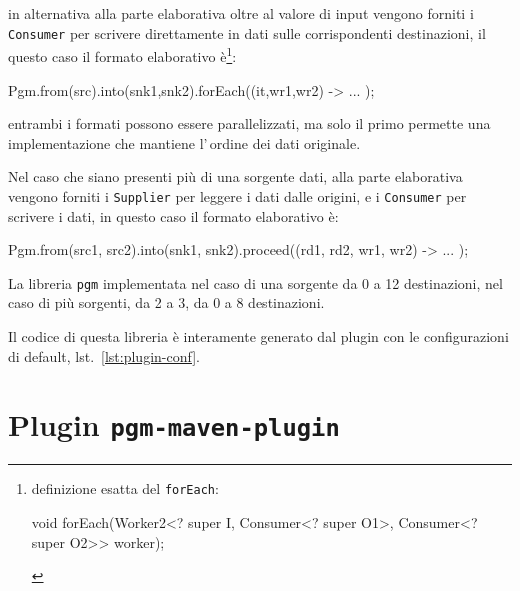 in alternativa alla parte elaborativa oltre al valore di input vengono forniti i
\texttt{Consumer} per scrivere direttamente in dati sulle corrispondenti
destinazioni, il questo caso il formato elaborativo è\footnote{%
    definizione esatta del \texttt{forEach}:
    \begin{javacode}
    void forEach(Worker2<? super I, Consumer<? super O1>, Consumer<? super O2>> worker);
    \end{javacode}
}:
\begin{elisting}[!htb]
\begin{javacode}
    Pgm.from(src).into(snk1,snk2).forEach((it,wr1,wr2) -> { ... });
\end{javacode}
\caption{elaborazione writer}
\label{lst:processWriter}
\end{elisting}
entrambi i formati possono essere parallelizzati, ma solo il primo permette una
implementazione che mantiene l'\,ordine dei dati originale.

Nel caso che siano presenti più di una sorgente dati, alla parte elaborativa
vengono forniti i \texttt{Supplier} per leggere i dati dalle origini, e i
\texttt{Consumer} per scrivere i dati, in questo caso il formato elaborativo è:
\begin{elisting}[!htb]
\begin{javacode}
    Pgm.from(src1, src2).into(snk1, snk2).proceed((rd1, rd2, wr1, wr2) -> { ... });
\end{javacode}
\caption{elaborazione reader-writer}
\label{lst:pullProcess}
\end{elisting}

La libreria \texttt{pgm} implementata
nel caso di una sorgente da 0 a 12 destinazioni,
nel caso di più sorgenti, da 2 a 3, da 0 a 8 destinazioni.

Il codice di questa libreria è interamente generato dal plugin con le
configurazioni di default, lst.~\ref{lst:plugin-conf}.

\section{Plugin \texttt{pgm-maven-plugin}} \label{sec:plugin}

